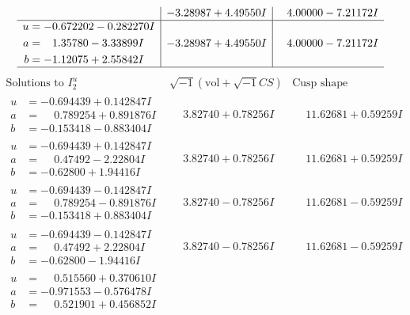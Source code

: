 \documentclass[1p]{elsarticle_modified}
\theoremstyle{definition}
\newcommand{\I}{\sqrt{-1}}
\begin{document}
$$\begin{array}{c|c|c}
 & -3.28987 + 4.49550 I & \phantom{-}4.00000 - 7.21172 I \\ \hline\begin{aligned}
u &= -0.672202 - 0.282270 I \\
a &= \phantom{-}1.35780 - 3.33899 I \\
b &= -1.12075 + 2.55842 I\end{aligned}
 & -3.28987 + 4.49550 I & \phantom{-}4.00000 - 7.21172 I\\
 \hline 
 \end{array}$$\newpage$$\begin{array}{c|c|c}  
\text{Solutions to }I^u_{2}& \I (\text{vol} + \sqrt{-1}CS) & \text{Cusp shape}\\
 \hline 
\begin{aligned}
u &= -0.694439 + 0.142847 I \\
a &= \phantom{-}0.789254 + 0.891876 I \\
b &= -0.153418 - 0.883404 I\end{aligned}
 & \phantom{-}3.82740 + 0.78256 I & \phantom{-}11.62681 + 0.59259 I \\ \hline\begin{aligned}
u &= -0.694439 + 0.142847 I \\
a &= \phantom{-}0.47492 - 2.22804 I \\
b &= -0.62800 + 1.94416 I\end{aligned}
 & \phantom{-}3.82740 + 0.78256 I & \phantom{-}11.62681 + 0.59259 I \\ \hline\begin{aligned}
u &= -0.694439 - 0.142847 I \\
a &= \phantom{-}0.789254 - 0.891876 I \\
b &= -0.153418 + 0.883404 I\end{aligned}
 & \phantom{-}3.82740 - 0.78256 I & \phantom{-}11.62681 - 0.59259 I \\ \hline\begin{aligned}
u &= -0.694439 - 0.142847 I \\
a &= \phantom{-}0.47492 + 2.22804 I \\
b &= -0.62800 - 1.94416 I\end{aligned}
 & \phantom{-}3.82740 - 0.78256 I & \phantom{-}11.62681 - 0.59259 I \\ \hline\begin{aligned}
u &= \phantom{-}0.515560 + 0.370610 I \\
a &= -0.971553 - 0.576478 I \\
b &= \phantom{-}0.521901 + 0.456852 I\end{aligned}

\end{array}$$
\end{document}
